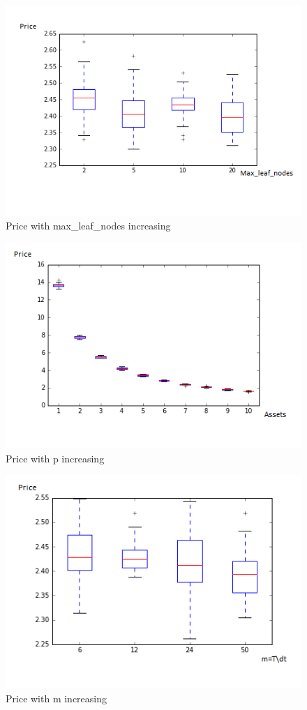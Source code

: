 \documentclass[english,11pt,openany]{article}
\begin{document}
	\begin{figure}[h]
		\includegraphics[scale=0.8]{Rforest_7_assets_rf_max_leaf_nodes_varying.png}
		\caption{Price with max\_leaf\_nodes increasing}
	\end{figure}
	
	\begin{figure}[h]
		\includegraphics[scale=0.8]{Rforest_p_assets.png}
		\caption{Price with p increasing}
	\end{figure}
	
	\begin{figure}[h]
		\includegraphics[scale=0.8]{Rforest_p_assets_m_varying.png}
		\caption{Price with m increasing}
	\end{figure}
	
\end{document}
